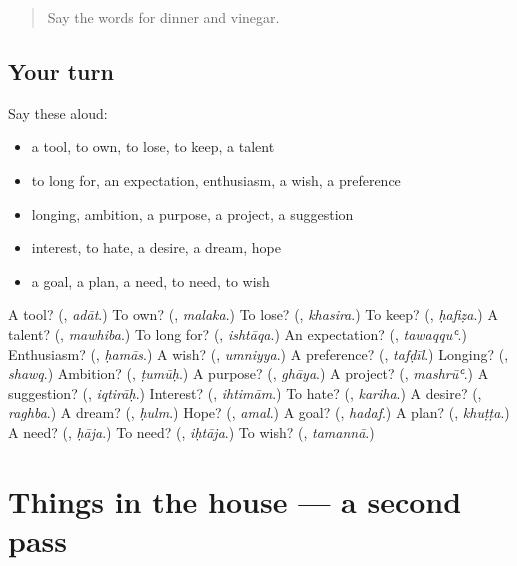 \label{lesson:AR-R119-first-pass-wanting-and-planning}



\begin{quote}
Say the words for dinner and vinegar.
\end{quote}

\subsection*{Your turn}
Say these aloud:

\begin{itemize}
\raggedright
  \item a tool, to own, to lose, to keep, a talent
  \item to long for, an expectation, enthusiasm, a wish, a preference
  \item longing, ambition, a purpose, a project, a suggestion
  \item interest, to hate, a desire, a dream, hope
  \item a goal, a plan, a need, to need, to wish
\end{itemize}

\begin{tcolorbox}[breakable,colback=teal!4,colframe=teal!35!black,title={Before you move on}]
A tool? (\textbf{}, \emph{adāt}.) To own? (\textbf{}, \emph{malaka}.) To lose? (\textbf{}, \emph{khasira}.) To keep? (\textbf{}, \emph{ḥafiẓa}.) A talent? (\textbf{}, \emph{mawhiba}.) To long for? (\textbf{}, \emph{ishtāqa}.) An expectation? (\textbf{}, \emph{tawaqquʿ}.) Enthusiasm? (\textbf{}, \emph{ḥamās}.) A wish? (\textbf{}, \emph{umniyya}.) A preference? (\textbf{}, \emph{tafḍīl}.) Longing? (\textbf{}, \emph{shawq}.) Ambition? (\textbf{}, \emph{ṭumūḥ}.) A purpose? (\textbf{}, \emph{ghāya}.) A project? (\textbf{}, \emph{mashrūʿ}.) A suggestion? (\textbf{}, \emph{iqtirāḥ}.) Interest? (\textbf{}, \emph{ihtimām}.) To hate? (\textbf{}, \emph{kariha}.) A desire? (\textbf{}, \emph{raghba}.) A dream? (\textbf{}, \emph{ḥulm}.) Hope? (\textbf{}, \emph{amal}.) A goal? (\textbf{}, \emph{hadaf}.) A plan? (\textbf{}, \emph{khuṭṭa}.) A need? (\textbf{}, \emph{ḥāja}.) To need? (\textbf{}, \emph{iḥtāja}.) To wish? (\textbf{}, \emph{tamannā}.)
\end{tcolorbox}
\section[(dialogue)]{Things in the house — a second pass}

